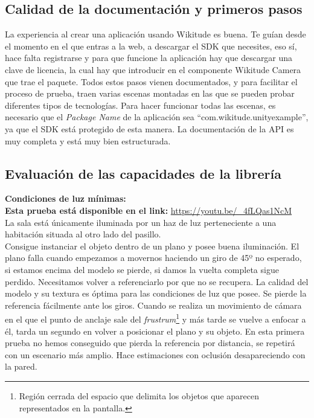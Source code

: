 \subsection{Calidad de la documentación y primeros pasos}
La experiencia al crear una aplicación usando Wikitude es buena. Te guían desde el momento en el que entras a la web, a descargar el SDK que necesites, eso sí, hace falta registrarse y para que funcione la aplicación hay que descargar una clave de licencia, la cual hay que introducir en el componente Wikitude Camera que trae el paquete. Todos estos pasos vienen documentados, y para facilitar el proceso de prueba, traen varias escenas montadas en las que se pueden probar diferentes tipos de tecnologías. Para hacer funcionar todas las escenas, es necesario que el \textit{Package Name} de la aplicación sea ``com.wikitude.unityexample'', ya que el SDK está protegido de esta manera. La documentación de la API es muy completa y está muy bien estructurada.\cite{WikitudeDoc}
\subsection{Evaluación de las capacidades de la librería}
\textbf{Condiciones de luz mínimas:}\\
\textbf{Esta prueba está disponible en el link:} \url{https://youtu.be/_4fLQas1NcM}\\

La sala está únicamente iluminada por un haz de luz perteneciente a una habitación situada al otro lado del pasillo.\\

Consigue instanciar el objeto dentro de un plano y posee buena iluminación. El plano falla cuando empezamos a movernos haciendo un giro de 45º no esperado, si estamos encima del modelo se pierde, si damos la vuelta completa sigue perdido. Necesitamos volver a referenciarlo por que no se recupera. La calidad del modelo y su textura es óptima para las condiciones de luz que posee. Se pierde la referencia fácilmente ante los giros. Cuando se realiza un movimiento de cámara en el que el punto de anclaje sale del \textit{frustrum}\footnote{Región cerrada del espacio que delimita los objetos que aparecen representados en la pantalla.}  y más tarde se vuelve a enfocar a él, tarda un segundo en volver a posicionar el plano y su objeto. En esta primera prueba no hemos conseguido que pierda la referencia por distancia, se repetirá con un escenario más amplio. Hace estimaciones con oclusión desapareciendo con la pared.\\

